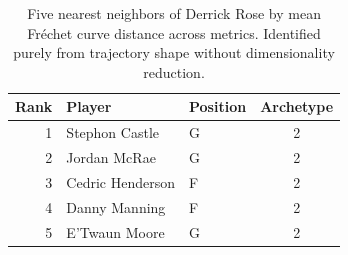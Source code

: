 \begin{table}[htbp]
  \centering\small
  \begin{tabular}{rllc}
    \toprule
    Rank & Player & Position & Archetype \\
    \midrule
    1 & Stephon Castle & G & 2 \\
    2 & Jordan McRae & G & 2 \\
    3 & Cedric Henderson & F & 2 \\
    4 & Danny Manning & F & 2 \\
    5 & E'Twaun Moore & G & 2 \\
    \bottomrule
  \end{tabular}
  \caption{Five nearest neighbors of Derrick Rose by mean Fr\'{e}chet curve distance across metrics. Identified purely from trajectory shape without dimensionality reduction.}
  \label{tab:Derrick_Rose_frechet_curve_neighbors}
\end{table}

